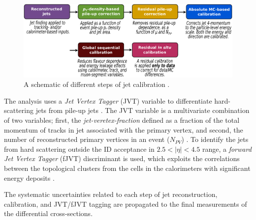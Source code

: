 \begin{figure}[!htb]
    \centering
    \includegraphics[width=.95\linewidth]{figures/LHC/JetCalib.pdf}
    \caption{ A schematic of different steps of jet calibration \cite{JetCalib}.\label{fig:JetCalib}}
\end{figure}

The analysis uses a \textit{Jet Vertex Tagger} (JVT) variable to differentiate hard-scattering jets from pile-up jets \cite{JVT}. The JVT variable is a multivariate combination of two variables; first, the \textit{jet-veretex-fraction} defined as a fraction of the total momentum of tracks in jet associated with the primary vertex, and second, the number of reconstructed primary vertices in an event ($N_{PV}$) \cite{JVT}. To identify the jets from hard scattering outside the ID acceptance in $2.5<|\eta|<4.5$ range, a \textit{forward Jet Vertex Tagger} (fJVT) discriminant is used, which exploits the correlations between the topological clusters from the cells in the calorimeters with significant energy deposits \cite{fJVT}.

The systematic uncertainties related to each step of jet reconstruction, calibration, and JVT/fJVT tagging are propagated to the final measurements of the differential cross-sections. 
